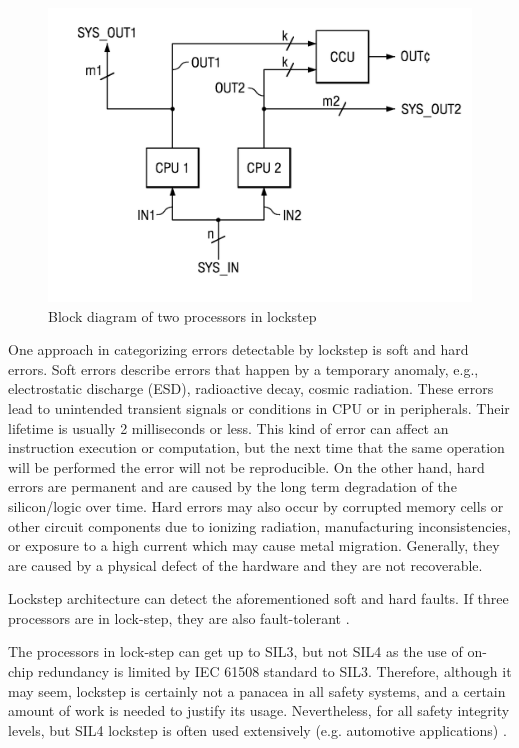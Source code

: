 \begin{figure}[H]

      \centering
      \includegraphics[width=0.9\linewidth]{images/patent_not_delayed.png}
      \caption{Block diagram of two processors in lockstep}
      \label{fig:patent_not_delayed}
    
\end{figure}

One approach in categorizing errors detectable by lockstep is soft and hard errors. Soft errors describe errors that happen by a temporary anomaly, e.g., electrostatic discharge (ESD), radioactive decay, cosmic radiation. These errors lead to unintended transient signals or conditions in CPU or in peripherals. Their lifetime is usually 2 milliseconds or less. This kind of error can affect an instruction execution or computation, but
the next time that the same operation will be performed the error will not be reproducible. On the other hand, hard errors are permanent and are caused by the
long term degradation of the silicon/logic over time. Hard errors may also occur
by corrupted memory cells or other circuit components due to ionizing radiation,
manufacturing inconsistencies, or exposure to a high current which may cause
metal migration. Generally, they are caused by a physical defect of the hardware and
they are not recoverable.

Lockstep architecture can detect the aforementioned soft and hard faults. If three processors are in lock-step, they are also fault-tolerant \citep{lockstep_analysis}. 

The processors in lock-step can get up to SIL3, but not SIL4 as the use of on-chip redundancy is limited by IEC 61508 standard to SIL3. Therefore, although it may seem, lockstep is certainly not a panacea in all safety systems, and a certain amount of work is needed to justify its usage. Nevertheless, for all safety integrity levels, but SIL4 lockstep is often used extensively (e.g. automotive applications) \citep{ipavic_lockstep}. 

